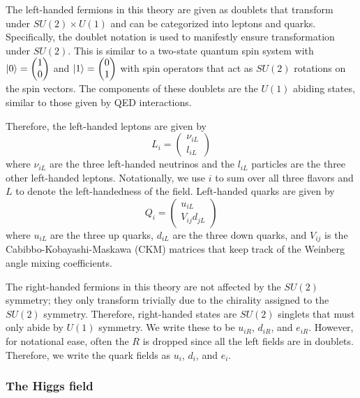 The left-handed fermions in this theory are given as doublets that transform under $SU(2) \times U(1)$ and can be categorized into leptons and quarks. Specifically, the doublet notation is used to manifestly ensure transformation under $SU(2)$. This is similar to a two-state quantum spin system with $\ket{0} = \begin{pmatrix} 1 \\ 0 \end{pmatrix}$ and $\ket{1} = \begin{pmatrix} 0 \\ 1 \end{pmatrix}$ with spin operators that act as $SU(2)$ rotations on the spin vectors. The components of these doublets are the $U(1)$ abiding states, similar to those given by QED interactions.

Therefore, the left-handed leptons are given by
\begin{equation}
L_{i} = \begin{pmatrix}
\nu_{iL} \\ l_{iL}
\end{pmatrix}
\end{equation}
where $\nu_{iL}$ are the three left-handed neutrinos and the $l_{iL}$ particles are the three other left-handed leptons. Notationally, we use $i$ to sum over all three flavors and $L$ to denote the left-handedness of the field. Left-handed quarks are given by
\begin{equation}
Q_{i} = \begin{pmatrix}
u_{iL} \\ V_{ij} d_{jL}
\end{pmatrix}
\end{equation}
where $u_{iL}$ are the three up quarks, $d_{iL}$ are the three down quarks, and $V_{ij}$ is the Cabibbo-Kobayashi-Maskawa (CKM) matrices that keep track of the Weinberg angle mixing coefficients.

The right-handed fermions in this theory are not affected by the $SU(2)$ symmetry; they only transform trivially due to the chirality assigned to the $SU(2)$ symmetry. Therefore, right-handed states are $SU(2)$ singlets that must only abide by $U(1)$ symmetry. We write these to be $u_{iR}$, $d_{iR}$, and $e_{iR}$. However, for notational ease, often the $R$ is dropped since all the left fields are in doublets. Therefore, we write the quark fields as $u_{i}$, $d_{i}$, and $e_{i}$.

\subsubsection{The Higgs field}

